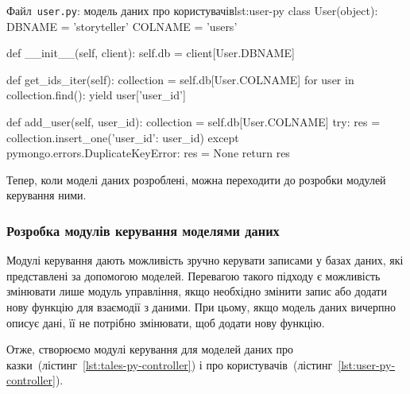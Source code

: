 \documentclass[
	a4paper,
	oneside,
	BCOR = 10mm,
	DIV = 12,
	12pt,
	headings = normal,
]{scrartcl}
\newcommand{\filename}[1]{\texttt{#1}}
\begin{document}
				\begin{listingpython}{Файл~\filename{\textenglish{user.py}}: модель даних про користувачів}{lst:user-py}
class User(object):
    DBNAME = 'storyteller'
    COLNAME = 'users'

    def __init__(self, client):
        self.db = client[User.DBNAME]

    def get_ids_iter(self):
        collection = self.db[User.COLNAME]
        for user in collection.find({}):
            yield user['user_id']

    def add_user(self, user_id):
        collection = self.db[User.COLNAME]
        try:
            res = collection.insert_one({'user_id': user_id})
        except pymongo.errors.DuplicateKeyError:
            res = None
        return res
				\end{listingpython}
				Тепер, коли моделі даних розроблені, можна переходити до розробки модулей керування ними. 

			\subsubsection{Розробка модулів керування моделями даних}
				Модулі керування дають можливість зручно керувати записами у базах даних, які представлені за допомогою моделей. Перевагою такого підходу є можливість змінювати лише модуль управління, якщо необхідно змінити запис або додати нову функцію для взаємодії з даними. При цьому, якщо модель даних вичерпно описує дані, її не потрібно змінювати, щоб додати нову функцію.

				Отже, створюємо модулі керування для моделей даних про казки~(лістинг~\ref{lst:tales-py-controller}) і про користувачів~(лістинг~\ref{lst:user-py-controller}).
\end{document}
